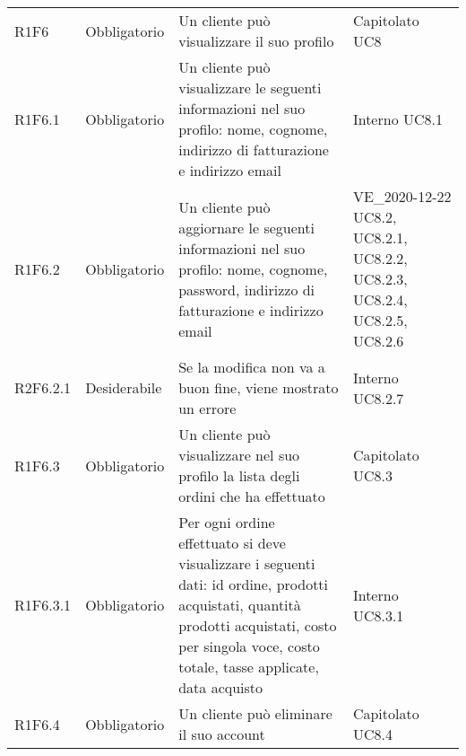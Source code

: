 {\begin{longtable}{C{2.5cm} C{2.8cm} C{6.7cm} C{2.5cm}}
R1F6 & Obbligatorio & Un cliente può visualizzare il suo profilo & Capitolato \newline UC8 \\
R1F6.1 & Obbligatorio & Un cliente può visualizzare le seguenti informazioni nel suo profilo: nome, cognome, indirizzo di fatturazione e indirizzo email & Interno \newline UC8.1\\
R1F6.2 & Obbligatorio & Un cliente può aggiornare le seguenti informazioni nel suo profilo: nome, cognome, password, indirizzo di fatturazione e indirizzo email & VE\_2020-12-22 \newline UC8.2, UC8.2.1, UC8.2.2, UC8.2.3, UC8.2.4, UC8.2.5, UC8.2.6 \\
R2F6.2.1 & Desiderabile & Se la modifica non va a buon fine, viene mostrato un errore & Interno UC8.2.7\\
R1F6.3 & Obbligatorio & Un cliente può visualizzare nel suo profilo la lista degli ordini che ha effettuato & Capitolato \newline UC8.3\\
R1F6.3.1 & Obbligatorio & Per ogni ordine effettuato si deve visualizzare i seguenti dati: id ordine, prodotti acquistati, quantità prodotti acquistati, costo per singola voce, costo totale, tasse applicate, data acquisto & Interno \newline UC8.3.1\\
R1F6.4 & Obbligatorio & Un cliente può eliminare il suo account & Capitolato \newline UC8.4\\



\end{longtable}}
